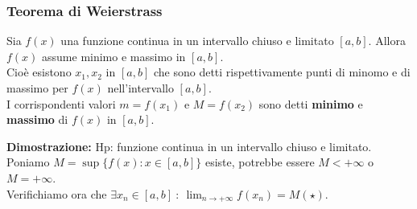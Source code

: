 \documentclass[../../main.tex]{subfiles}
\begin{document}
\subsubsection{Teorema di Weierstrass}
Sia $f(x)$ una funzione continua in un intervallo chiuso e limitato $[a, b]$.
Allora $f(x)$ assume minimo e massimo in $[a, b]$.\\ Cioè esistono $x_1, x_2$
in $[a, b]$ che sono detti rispettivamente punti di minomo e di massimo per
$f(x)$ nell'intervallo $[a, b]$.\\ I corrispondenti valori $m = f(x_1)$ e $M =
    f(x_2)$ sono detti \textbf{minimo} e \textbf{massimo} di $f(x)$ in $[a, b]$.
\begin{center}
\end{center}
\textbf{Dimostrazione:} Hp: funzione continua in un intervallo chiuso e limitato.\\
Poniamo $M = \sup \{f(x) : x\in [a, b]\}$ esiste, potrebbe essere $M < +\infty$ o $M = +\infty$. \\
Verifichiamo ora che $\exists x_n\in[a, b] \ : \ \lim_{n\to+\infty} f(x_n) = M (\star)$.
\end{document}
